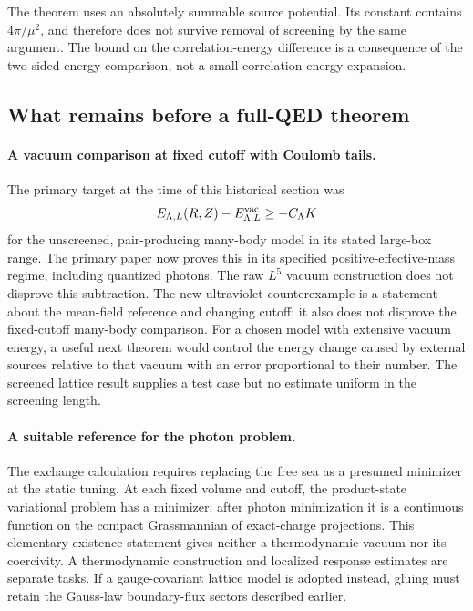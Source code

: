 \begin{enumerate}
The theorem uses an absolutely summable source potential. Its constant
contains \(4\pi/\mu^2\), and therefore does not survive removal of
screening by the same argument. The bound on the correlation-energy
difference is a consequence of the two-sided energy comparison, not
a small correlation-energy expansion.
\end{enumerate}

\subsection{What remains before a full-QED theorem}

\paragraph{A vacuum comparison at fixed cutoff with Coulomb tails.}
The primary target at the time of this historical section was
\[
 E_{\Lambda,L}(R,Z)-E_{\Lambda,L}^{\mathrm{vac}}\ge-C_\Lambda K
\]
for the unscreened, pair-producing many-body model in its stated
large-box range. The primary paper now proves this in its specified
positive-effective-mass regime, including quantized photons.
The raw \(L^5\) vacuum construction does not disprove
this subtraction. The new ultraviolet counterexample is a statement
about the mean-field reference and changing cutoff; it also does not
disprove the fixed-cutoff many-body comparison.
For a chosen model with extensive vacuum energy, a useful next theorem
would control the energy change caused by external sources relative
to that vacuum with an error proportional to their number. The
screened lattice result supplies a test case but no estimate uniform
in the screening length.

\paragraph{A suitable reference for the photon problem.}
The exchange calculation requires replacing the free sea as a presumed
minimizer at the static tuning. At each fixed volume and cutoff,
the product-state variational problem has a minimizer: after photon
minimization it is a continuous function on the compact Grassmannian
of exact-charge projections. This elementary existence statement gives
neither a thermodynamic vacuum nor its coercivity. A thermodynamic
construction and localized response estimates are separate tasks.
If a gauge-covariant lattice model is adopted instead, gluing must
retain the Gauss-law boundary-flux sectors described earlier.

